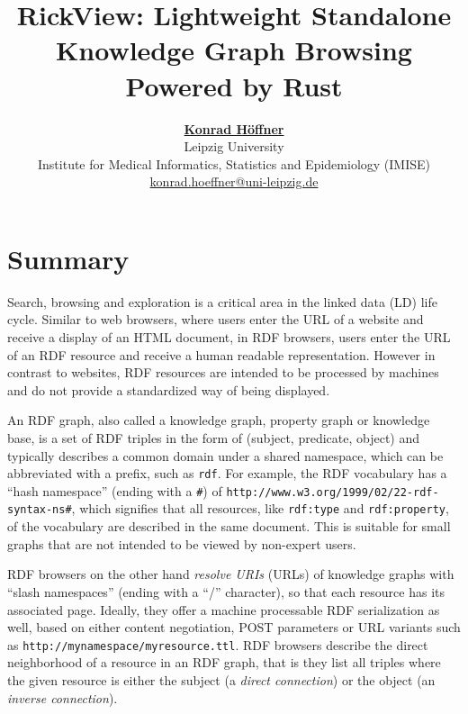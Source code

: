 \documentclass[a4paper,10pt]{article}
\begin{document}
\author{\href{https://orcid.org/0000-0001-7358-3217}{\textbf{Konrad Höffner}} \\ Leipzig University \\ 
Institute for Medical Informatics, Statistics and Epidemiology (IMISE)\\
\href{mailto:konrad.hoeffner@uni-leipzig.de}{konrad.hoeffner@uni-leipzig.de}}
\title{\textbf{RickView: Lightweight Standalone Knowledge Graph Browsing Powered by Rust}}
\date{}

\maketitle

\section{Summary}\label{summary}

Search, browsing and exploration is a critical area in the linked data (LD) life cycle.
Similar to web browsers, where users enter the URL of a website and receive a display of an HTML document, in RDF browsers,
users enter the URL of an RDF resource and receive a human readable representation.
However in contrast to websites, RDF resources are intended to be processed by machines and do not provide a standardized way of being displayed.

An RDF graph, also called a knowledge graph, property graph or knowledge base, is a set of RDF triples in the form of (subject, predicate, object) and typically describes a common domain under a shared namespace, which can be abbreviated with a prefix, such as \texttt{rdf}.
For example, the RDF vocabulary has a \enquote{hash namespace} (ending with a \texttt{\#}) of \texttt{http://www.w3.org/1999/02/22-rdf-syntax-ns\#},
which signifies that all resources, like \texttt{rdf:type} and \texttt{rdf:property}, of the vocabulary are described in the same document.
This is suitable for small graphs that are not intended to be viewed by non-expert users.

RDF browsers on the other hand \emph{resolve URIs} (URLs) of knowledge graphs with \enquote{slash namespaces} (ending with a \enquote{/} character), so that each resource has its associated page.
Ideally, they offer a machine processable RDF serialization as well, based on either content negotiation, POST parameters or URL variants such as \texttt{http://mynamespace/myresource.ttl}.
RDF browsers describe the direct neighborhood of a resource in an RDF graph, that is they list all triples where the given resource is either the subject (a \emph{direct connection}) or the object (an \emph{inverse connection}).
\end{document}
